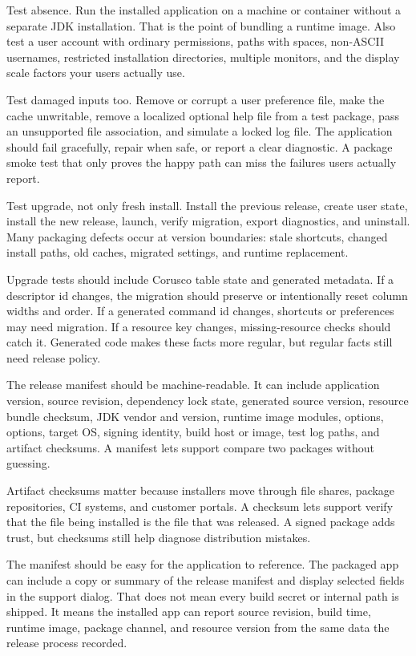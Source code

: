 Test absence. Run the installed application on a machine or container without a separate JDK installation. That is the point of bundling a runtime image. Also test a user account with ordinary permissions, paths with spaces, non-ASCII usernames, restricted installation directories, multiple monitors, and the display scale factors your users actually use.

Test damaged inputs too. Remove or corrupt a user preference file, make the cache unwritable, remove a localized optional help file from a test package, pass an unsupported file association, and simulate a locked log file. The application should fail gracefully, repair when safe, or report a clear diagnostic. A package smoke test that only proves the happy path can miss the failures users actually report.

Test upgrade, not only fresh install. Install the previous release, create user state, install the new release, launch, verify migration, export diagnostics, and uninstall. Many packaging defects occur at version boundaries: stale shortcuts, changed install paths, old caches, migrated settings, and runtime replacement.

Upgrade tests should include Corusco table state and generated metadata. If a descriptor id changes, the migration should preserve or intentionally reset column widths and order. If a generated command id changes, shortcuts or preferences may need migration. If a resource key changes, missing-resource checks should catch it. Generated code makes these facts more regular, but regular facts still need release policy.

The release manifest should be machine-readable. It can include application version, source revision, dependency lock state, generated source version, resource bundle checksum, JDK vendor and version, runtime image modules,  options,  options, target OS, signing identity, build host or image, test log paths, and artifact checksums. A manifest lets support compare two packages without guessing.

Artifact checksums matter because installers move through file shares, package repositories, CI systems, and customer portals. A checksum lets support verify that the file being installed is the file that was released. A signed package adds trust, but checksums still help diagnose distribution mistakes.

The manifest should be easy for the application to reference. The packaged app can include a copy or summary of the release manifest and display selected fields in the support dialog. That does not mean every build secret or internal path is shipped. It means the installed app can report source revision, build time, runtime image, package channel, and resource version from the same data the release process recorded.

